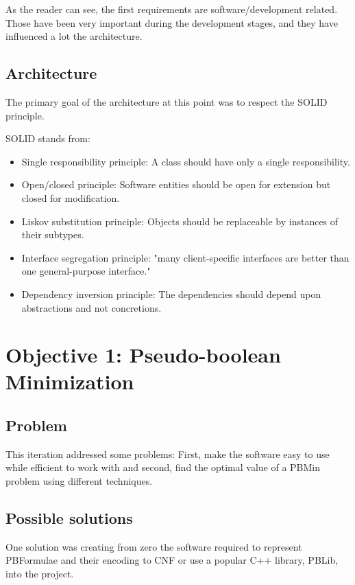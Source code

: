 As the reader can see, the first requirements are software/development related. Those have been very important during the development stages, and they have influenced a lot the architecture.  

\subsection{Architecture}

The primary goal of the architecture at this point was to respect the SOLID principle.  

SOLID stands from: 
\begin{itemize}
	\item Single responsibility principle: A class should have only a single responsibility.  
	\item Open/closed principle: Software entities should be open for extension but closed for modification. 
	\item Liskov substitution principle: Objects should be replaceable by instances of their subtypes.  
	\item Interface segregation principle: "many client-specific interfaces are better than one general-purpose interface."
	\item Dependency inversion principle: The dependencies should depend upon abstractions and not concretions.
\end{itemize}

\section{Objective 1: Pseudo-boolean Minimization}

\subsection{Problem}
This iteration addressed some problems: First, make the software easy to use while efficient to work with and second, find the optimal value of a PBMin problem using different techniques.  

\subsection{Possible solutions}
One solution was creating from zero the software required to represent PBFormulae and their encoding to CNF or use a popular C++ library, PBLib, into the project. 


